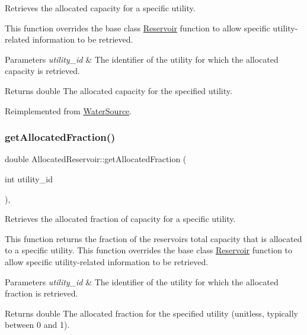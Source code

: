 Retrieves the allocated capacity for a specific utility. 

This function overrides the base class {\ttfamily \mbox{\hyperlink{classReservoir}{Reservoir}}} function to allow specific utility-\/related information to be retrieved.


\begin{DoxyParams}{Parameters}
{\em utility\+\_\+id} & The identifier of the utility for which the allocated capacity is retrieved.\\
\hline
\end{DoxyParams}
\begin{DoxyReturn}{Returns}
double The allocated capacity for the specified utility. 
\end{DoxyReturn}


Reimplemented from \mbox{\hyperlink{classWaterSource_ad218f2a603d7ebce268d800e0249a74c}{Water\+Source}}.

\mbox{\label{classAllocatedReservoir_a731381982c9245b0bf24db4082dc74c1}} 
\subsubsection{\texorpdfstring{get\+Allocated\+Fraction()}{getAllocatedFraction()}}
{\footnotesize\ttfamily double Allocated\+Reservoir\+::get\+Allocated\+Fraction (\begin{DoxyParamCaption}\item[{int}]{utility\+\_\+id }\end{DoxyParamCaption})\hspace{0.3cm}{\ttfamily [override]}, {\ttfamily [virtual]}}



Retrieves the allocated fraction of capacity for a specific utility. 

This function returns the fraction of the reservoir\textquotesingle{}s total capacity that is allocated to a specific utility. This function overrides the base class {\ttfamily \mbox{\hyperlink{classReservoir}{Reservoir}}} function to allow specific utility-\/related information to be retrieved.


\begin{DoxyParams}{Parameters}
{\em utility\+\_\+id} & The identifier of the utility for which the allocated fraction is retrieved.\\
\hline
\end{DoxyParams}
\begin{DoxyReturn}{Returns}
double The allocated fraction for the specified utility (unitless, typically between 0 and 1). 
\end{DoxyReturn}


